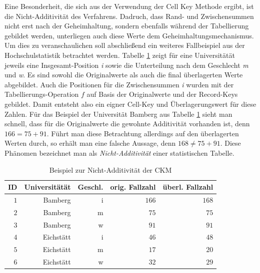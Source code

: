 Eine Besonderheit, die sich aus der Verwendung der Cell Key Methode ergibt, ist die Nicht-Additivität des Verfahrens. Dadruch, dass Rand- und Zwischensummen nicht erst nach der Geheimhaltung, sondern ebenfalls während der Tabellierung gebildet werden, unterliegen auch diese Werte dem Geheimhaltungsmechanismus. Um dies zu veranschaulichen soll abschlie\ss end ein weiteres Fallbeispiel aus der Hochschulstatistik betrachtet werden. Tabelle \ref{tab_additivity} zeigt für eine Universitätät jeweils eine Insgesamt-Position \textit{i} sowie die Unterteilung nach dem Geschlecht \textit{m} und \textit{w}. Es sind sowohl die Originalwerte als auch die final überlagerten Werte abgebildet. Auch die Positionen für die Zwischensummen \textit{i} wurden mit der Tabellierungs-Operation $f$ auf Basis der Originalwerte und der Record-Keys gebildet. Damit entsteht also ein eigner Cell-Key und Überlagerungswert für diese Zahlen. Für das Beispiel der Universität Bamberg aus Tabelle \ref{tab_additivity} sieht man schnell, dass für die Originalwerte die gewohnte Additivität vorhanden ist, denn $166 = 75 + 91$. Führt man diese Betrachtung allerdings auf den überlagerten Werten durch, so erhält man eine falsche Aussage, denn $168 \neq 75 + 91$. Diese Phänomen bezeichnet man als \textit{Nicht-Additivität} einer statistischen Tabelle.

\begin{table}[h]
    \centering
    \begin{tabular}{ r r r r r}
        \textbf{ID} \vline & \textbf{Universitätät} & \textbf{Geschl.} & \textbf{orig. Fallzahl} & \textbf{überl. Fallzahl} \\ 
        \hline
        $1$ \vline & Bamberg & i & $166$ & $168$ \\
        $2$ \vline & Bamberg & m & $75$ & $75$ \\
        $3$ \vline & Bamberg & w & $91$ & $91$ \\
        $4$ \vline & Eichstätt & i & $46$ & $48$ \\
        $5$ \vline & Eichstätt & m & $17$ & $20$ \\
        $6$ \vline & Eichstätt & w & $32$ & $29$
    \end{tabular}
    \caption{Beispiel zur Nicht-Additivität der CKM}
    \label{tab_additivity}
\end{table}

